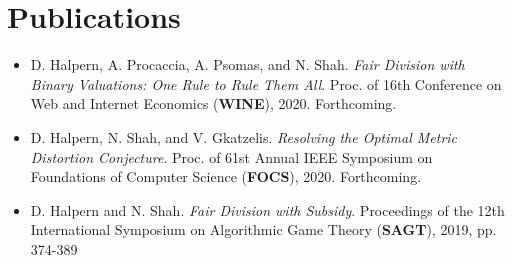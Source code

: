 \documentclass{article}
\begin{document}
    \section{Publications}
    \begin{itemize}
        \setlength\itemsep{3ex}
        \item D. Halpern, A. Procaccia, A. Psomas, and N. Shah. \textit{Fair Division with Binary Valuations: One
        Rule to Rule
        Them All}. Proc. of 16th Conference on Web and Internet Economics (\textbf{WINE}), 2020. Forthcoming.

        \item D. Halpern, N. Shah, and V. Gkatzelis. \textit{Resolving the Optimal Metric Distortion Conjecture}.
        Proc. of 61st Annual IEEE Symposium on Foundations of Computer Science (\textbf{FOCS}), 2020. Forthcoming.

        \item D. Halpern and N. Shah. \textit{Fair Division with Subsidy}. Proceedings of the 12th International Symposium on
        Algorithmic Game Theory (\textbf{SAGT}), 2019, pp. 374-389

    \end{itemize}
\end{document}
